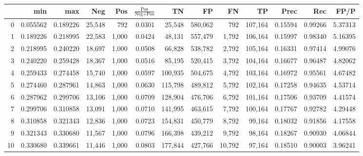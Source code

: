 \begin{tabular}{rrrrrrrrrrrrr}
\toprule
{} &       min &       max &     Neg &    Pos & $\frac{\text{Pos}}{\text{Neg}+\text{Pos}}$ &       TN &       FP &       FN &       TP &     Prec &      Rec &     FP/P \\
\midrule
0   &  0.055562 &  0.189226 &  25,548 &    792 &                                     0.0301 &   25,548 &  580,062 &      792 &  107,164 &  0.15594 &  0.99266 &  5.37313 \\
1   &  0.189226 &  0.218995 &  22,583 &  1,000 &                                     0.0424 &   48,131 &  557,479 &    1,792 &  106,164 &  0.15997 &  0.98340 &  5.16395 \\
2   &  0.218995 &  0.240220 &  18,697 &  1,000 &                                     0.0508 &   66,828 &  538,782 &    2,792 &  105,164 &  0.16331 &  0.97414 &  4.99076 \\
3   &  0.240220 &  0.259428 &  18,367 &  1,000 &                                     0.0516 &   85,195 &  520,415 &    3,792 &  104,164 &  0.16677 &  0.96487 &  4.82062 \\
4   &  0.259433 &  0.274458 &  15,740 &  1,000 &                                     0.0597 &  100,935 &  504,675 &    4,792 &  103,164 &  0.16972 &  0.95561 &  4.67482 \\
5   &  0.274460 &  0.287961 &  14,863 &  1,000 &                                     0.0630 &  115,798 &  489,812 &    5,792 &  102,164 &  0.17258 &  0.94635 &  4.53714 \\
6   &  0.287962 &  0.299706 &  13,106 &  1,000 &                                     0.0709 &  128,904 &  476,706 &    6,792 &  101,164 &  0.17506 &  0.93709 &  4.41574 \\
7   &  0.299706 &  0.310858 &  13,091 &  1,000 &                                     0.0710 &  141,995 &  463,615 &    7,792 &  100,164 &  0.17767 &  0.92782 &  4.29448 \\
8   &  0.310858 &  0.321343 &  12,836 &  1,000 &                                     0.0723 &  154,831 &  450,779 &    8,792 &   99,164 &  0.18032 &  0.91856 &  4.17558 \\
9   &  0.321343 &  0.330680 &  11,567 &  1,000 &                                     0.0796 &  166,398 &  439,212 &    9,792 &   98,164 &  0.18267 &  0.90930 &  4.06844 \\
10  &  0.330680 &  0.339661 &  11,446 &  1,000 &                                     0.0803 &  177,844 &  427,766 &   10,792 &   97,164 &  0.18510 &  0.90003 &  3.96241 \\

\end{tabular}
